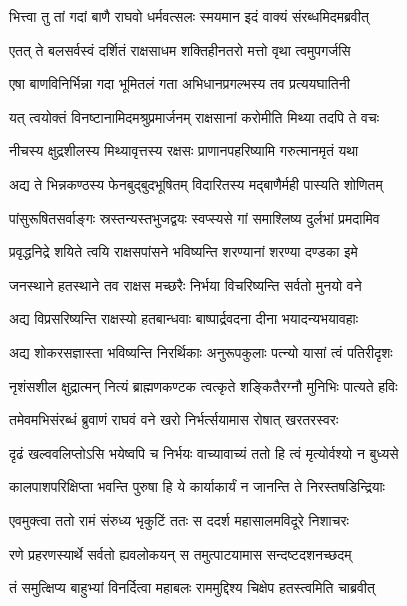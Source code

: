 
\twolineshloka
{भित्त्वा तु तां गदां बाणै राघवो धर्मवत्सलः}
{स्मयमान इदं वाक्यं संरब्धमिदमब्रवीत्} %

\twolineshloka
{एतत् ते बलसर्वस्वं दर्शितं राक्षसाधम}
{शक्तिहीनतरो मत्तो वृथा त्वमुपगर्जसि} %

\twolineshloka
{एषा बाणविनिर्भिन्ना गदा भूमितलं गता}
{अभिधानप्रगल्भस्य तव प्रत्ययघातिनी} %

\twolineshloka
{यत् त्वयोक्तं विनष्टानामिदमश्रुप्रमार्जनम्}
{राक्षसानां करोमीति मिथ्या तदपि ते वचः} %

\twolineshloka
{नीचस्य क्षुद्रशीलस्य मिथ्यावृत्तस्य रक्षसः}
{प्राणानपहरिष्यामि गरुत्मानमृतं यथा} %

\twolineshloka
{अद्य ते भिन्नकण्ठस्य फेनबुद्बुदभूषितम्}
{विदारितस्य मद्बाणैर्मही पास्यति शोणितम्} %

\twolineshloka
{पांसुरूषितसर्वाङ्गः स्रस्तन्यस्तभुजद्वयः}
{स्वप्स्यसे गां समाश्लिष्य दुर्लभां प्रमदामिव} %

\twolineshloka
{प्रवृद्धनिद्रे शयिते त्वयि राक्षसपांसने}
{भविष्यन्ति शरण्यानां शरण्या दण्डका इमे} %

\twolineshloka
{जनस्थाने हतस्थाने तव राक्षस मच्छरैः}
{निर्भया विचरिष्यन्ति सर्वतो मुनयो वने} %

\twolineshloka
{अद्य विप्रसरिष्यन्ति राक्षस्यो हतबान्धवाः}
{बाष्पार्द्रवदना दीना भयादन्यभयावहाः} %

\twolineshloka
{अद्य शोकरसज्ञास्ता भविष्यन्ति निरर्थिकाः}
{अनुरूपकुलाः पत्न्यो यासां त्वं पतिरीदृशः} %

\twolineshloka
{नृशंसशील क्षुद्रात्मन् नित्यं ब्राह्मणकण्टक}
{त्वत्कृते शङ्कितैरग्नौ मुनिभिः पात्यते हविः} %

\twolineshloka
{तमेवमभिसंरब्धं ब्रुवाणं राघवं वने}
{खरो निर्भर्त्सयामास रोषात् खरतरस्वरः} %

\twolineshloka
{दृढं खल्ववलिप्तोऽसि भयेष्वपि च निर्भयः}
{वाच्यावाच्यं ततो हि त्वं मृत्योर्वश्यो न बुध्यसे} %

\twolineshloka
{कालपाशपरिक्षिप्ता भवन्ति पुरुषा हि ये}
{कार्याकार्यं न जानन्ति ते निरस्तषडिन्द्रियाः} %

\twolineshloka
{एवमुक्त्वा ततो रामं संरुध्य भृकुटिं ततः}
{स ददर्श महासालमविदूरे निशाचरः} %

\twolineshloka
{रणे प्रहरणस्यार्थे सर्वतो ह्यवलोकयन्}
{स तमुत्पाटयामास सन्दष्टदशनच्छदम्} %

\twolineshloka
{तं समुत्क्षिप्य बाहुभ्यां विनर्दित्वा महाबलः}
{राममुद्दिश्य चिक्षेप हतस्त्वमिति चाब्रवीत्} %

